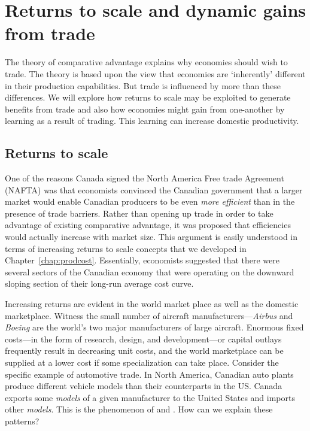 \section{Returns to scale and dynamic gains from trade}\label{sec:ch15sec4}

The theory of comparative advantage explains why economies should wish to
trade. The theory is based upon the view that economies are `inherently'
different in their production capabilities. But trade is influenced by more
than these differences. We will explore how returns to scale may be
exploited to generate benefits from trade and also how economies might gain
from one-another by learning as a result of trading. This learning can
increase domestic productivity.

\subsection*{Returns to scale}

One of the reasons Canada signed the North America Free trade Agreement
(NAFTA) was that economists convinced the Canadian government that a larger
market would enable Canadian producers to be even \textit{more efficient}
than in the presence of trade barriers. Rather than opening up trade in
order to take advantage of existing comparative advantage, it was proposed
that efficiencies would actually increase with market size. This argument is
easily understood in terms of increasing returns to scale concepts that we
developed in Chapter~\ref{chap:prodcost}. Essentially, economists suggested
that there were several sectors of the Canadian economy that were operating
on the downward sloping section of their long-run average cost curve.

Increasing returns are evident in the world market place as well as the
domestic marketplace. Witness the small number of aircraft
manufacturers---\textit{Airbus} and \textit{Boeing} are the world's two major manufacturers of
large aircraft. Enormous fixed costs---in the form of research, design, and
development---or capital outlays frequently result in decreasing unit costs,
and the world marketplace can be supplied at a lower cost if some
specialization can take place. Consider the specific example of automotive
trade. In North America, Canadian auto plants produce
different vehicle models than their counterparts in the US. Canada exports
some \textit{models} of a given manufacturer to the United States and
imports other \textit{models}. This is the phenomenon of %
 and . How
can we explain these patterns?


